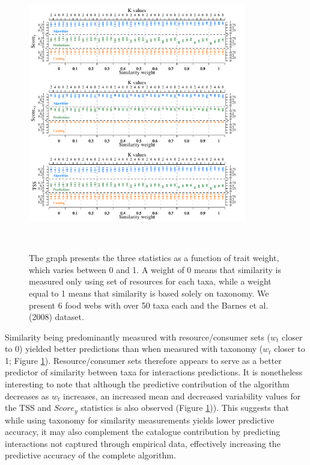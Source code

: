 \documentclass[letterpaper]{article}
\begin{document}
\begin{figure}[h!]
  \centering\includegraphics[width=0.85\textwidth, height=12cm]{multiple_parameters2.pdf}
  \caption{The graph presents the three statistics as a function of trait weight, which varies between 0 and 1. A weight of 0 means that similarity is measured only using set of resources for each taxa, while a weight equal to 1 means that similarity is based solely on taxonomy. We present 6 food webs with over 50 taxa each and the Barnes et al. (2008) dataset.}
  \label{fig:multi_param}
\end{figure}

Similarity being predominantly measured with resource/consumer sets ($w_t$ closer to 0) yielded better predictions than when measured with taxonomy ($w_t$ closer to 1; Figure \ref{fig:multi_param}). Resource/consumer sets therefore appears to serve as a better predictor of similarity between taxa for interactions predictions. It is nonetheless interesting to note that although the predictive contribution of the algorithm decreases as $w_t$ increases, an increased mean and decreased variability values for the TSS and $Score_y$ statistics is also observed (Figure \ref{fig:multi_param})). This suggests that while using taxonomy for similarity measurements yields lower predictive accuracy, it may also complement the catalogue contribution by predicting interactions not captured through empirical data, effectively increasing the predictive accuracy of the complete algorithm.
\end{document}
